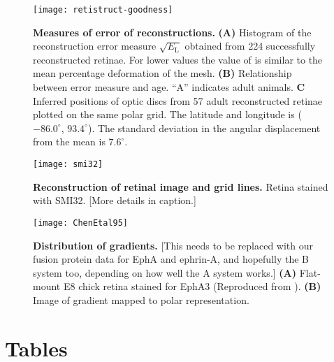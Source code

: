 \documentclass[10pt]{article}
\newcommand{\todo}[1]{{\color{red}[#1]}}
\begin{document}
\begin{figure}[!ht]
  \centering
  \texttt{[image: retistruct-goodness]}
  \caption{\textbf{Measures of error of reconstructions.}
    \textbf{(A)} Histogram of the reconstruction error measure
    $\sqrt{E_\mathrm{L}}$ obtained from 224 successfully reconstructed
    retinae. For lower values the value of is similar to the mean
    percentage deformation of the mesh. \textbf{(B)} Relationship
    between error measure and age. ``A'' indicates adult
    animals. \textbf{C} Inferred positions of optic discs from 57
    adult reconstructed retinae plotted on the same polar grid. The
    latitude and longitude is ($-86.0^\circ$, $93.4^\circ$). The
    standard deviation in the angular displacement from the mean is
    $7.6^\circ$.}
  \label{retistruct_plos:fig:summary}
\end{figure}

\begin{figure}[!ht]
  \centering
  \texttt{[image: smi32]}
  \caption{\textbf{Reconstruction of retinal image and grid lines.}
    Retina stained with SMI32. \todo{More details in caption.}}
  \label{retistruct_plos:fig:superpose}
\end{figure}

\begin{figure}[!ht]
  \centering
  \texttt{[image: ChenEtal95]}
  \caption{\textbf{Distribution of gradients.}
    \todo{This needs to be replaced with our fusion protein data for
      EphA and ephrin-A, and hopefully the B system too, depending on
      how well the A system works.}
    \textbf{(A)} Flat-mount E8 chick retina stained for EphA3
    (Reproduced from \cite{ChenEtal95comp}). \textbf{(B)} Image of
    gradient mapped to polar representation.  }
  \label{retistruct_plos:fig:superpose}
\end{figure}

\section*{Tables}
\end{document}

